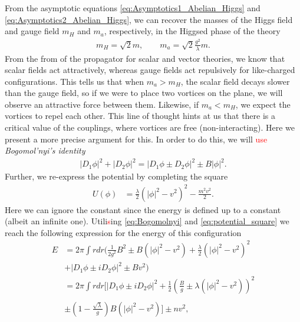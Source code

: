     From the asymptotic equations \eqref{eq:Asymptotics1_Abelian_Higgs} and \eqref{eq:Asymptotics2_Abelian_Higgs}, we can recover the masses of the Higgs field and gauge field $m_{H}$ and $m_a$, respectively, in the Higgsed phase of the theory 
    \begin{align}
        m_{H}= \sqrt{2} m, \qquad m_a = \sqrt{2} \frac{g^2}{\lambda}m .
    \end{align}
    From the from of the propagator for scalar and vector theories, we know that scalar fields act attractively, whereas gauge fields act repulsively for like-charged configurations. This tells us that when $m_a>m_H$, the scalar field decays slower than the gauge field, so if we were to place two vortices on the plane, we will observe an attractive force between them. Likewise, if  $m_a<m_H$, we expect the vortices to repel each other. This line of thought hints at us that there is a critical value of the couplings, where vortices are free (non-interacting). Here we present a more precise argument for this. In order to do this, we will \textcolor{red}{use} \textit{Bogomol'nyi's identity}
    \begin{align}
        |D_1 \phi|^2 + |D_2 \phi|^2 = |D_1 \phi \pm D_2 \phi|^2 \pm B |\phi|^2. \label{eq:Bogomolnyi}
    \end{align}
    Further, we re-express the potential by completing the square
    \begin{align}
        U(\phi)&=\frac{\lambda}{2} \left( |\phi|^2 - v^2 \right)^2 - \frac{m^2 v^2}{2}. \label{eq:potential_square}
    \end{align}
    Here we can ignore the constant since the energy is defined up to a constant (albeit an infinite one). Utili\textcolor{red}{s}ing \eqref{eq:Bogomolnyi} and \eqref{eq:potential_square} we reach the following expression for the energy of this configuration
    \begin{align}
        E &= 2 \pi \int r dr \bigg(\frac{1}{2 g^2}B^2 \pm B(|\phi|^2 -v^2) + \frac{\lambda}{2} \left(|\phi|^2 -v^2 \right)^2 \\ \nonumber 
        &+ |D_1\phi \pm i D_2 \phi|^2 \pm B v^2 \bigg) \\ \nonumber
        &= 2 \pi \int r dr \bigg[|D_1\phi \pm i D_2 \phi|^2 +\frac{1}{2}\left( \frac{B}{g} \pm \lambda \left(|\phi|^2 -v^2  \right) \right)^2   \\ \nonumber \\
        &\pm \left(1 - \frac{\sqrt{\lambda}}{g} \right) B \left(|\phi|^2 - v^2 \right) \bigg] \pm n v^2,
    \end{align}
